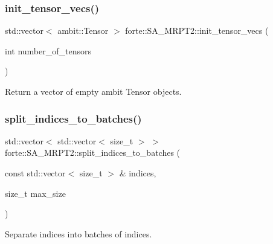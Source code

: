 \subsubsection{\texorpdfstring{init\+\_\+tensor\+\_\+vecs()}{init\_tensor\_vecs()}}
{\footnotesize\ttfamily std\+::vector$<$ ambit\+::\+Tensor $>$ forte\+::\+S\+A\+\_\+\+M\+R\+P\+T2\+::init\+\_\+tensor\+\_\+vecs (\begin{DoxyParamCaption}\item[{int}]{number\+\_\+of\+\_\+tensors }\end{DoxyParamCaption})\hspace{0.3cm}{\ttfamily [protected]}}



Return a vector of empty ambit Tensor objects. 

\mbox{\label{classforte_1_1_s_a___m_r_p_t2_a34195dd921dbce47b56deec123515d7e}} 
\subsubsection{\texorpdfstring{split\+\_\+indices\+\_\+to\+\_\+batches()}{split\_indices\_to\_batches()}}
{\footnotesize\ttfamily std\+::vector$<$ std\+::vector$<$ size\+\_\+t $>$ $>$ forte\+::\+S\+A\+\_\+\+M\+R\+P\+T2\+::split\+\_\+indices\+\_\+to\+\_\+batches (\begin{DoxyParamCaption}\item[{const std\+::vector$<$ size\+\_\+t $>$ \&}]{indices,  }\item[{size\+\_\+t}]{max\+\_\+size }\end{DoxyParamCaption})\hspace{0.3cm}{\ttfamily [protected]}}



Separate indices into batches of indices. 

\mbox{\label{classforte_1_1_s_a___m_r_p_t2_a9ada26865f0d7ee12f277e6ceea12b6b}} 
